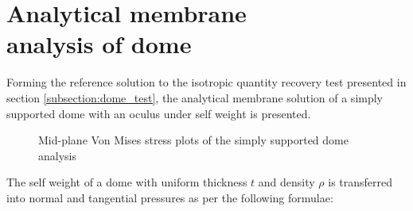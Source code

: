 
\chapter[Analytical membrane analysis of dome]{Analytical membrane\\ analysis of dome}
\label{app:Analytical membrane analysis of dome}
\renewcommand{\Thema}{Analytical membrane analysis of dome}

Forming the reference solution to the isotropic quantity recovery test presented in section \ref{subsection:dome_test}, the analytical membrane solution of a simply supported dome with an oculus under self weight is presented.

\begin{figure}[H]
	\caption{\label{App3_dome}Mid-plane Von Mises stress plots of the simply supported dome analysis}
\end{figure}

The self weight of a dome with uniform thickness $t$ and density $\rho$ is transferred into normal and tangential pressures as per the following formulae:

